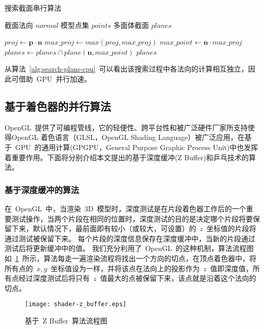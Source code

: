 \begin{algorithm}[htbp]
\small
\caption{搜索截面串行算法}
\label{alg:search-plans-cpu}
\begin{algorithmic}[1]
\REQUIRE
截面法向 $normal$
模型点集 $points$
\ENSURE
多面体截面 $planes$

        \STATE $proj \gets  \bm{p} \cdot \bm{n}$ 
        \STATE $max\_proj \gets max(proj, max\_proj)$ 
    \ENDFOR
\ENDFOR
{}
    \STATE $max\_point \gets \bm{n} \cdot max\_proj$ 
    \STATE $planes\gets planes \cap plane(\bm{n}, max\_point)$ 
\ENDFOR
\RETURN $planes$
\end{algorithmic}
\end{algorithm}

从算法~\ref{alg:search-plans-cpu}~可以看出该搜索过程中各法向的计算相互独立，因此可借助~GPU~并行加速。

\subsection{基于着色器的并行算法}
\label{subsec:determ-normals-by-shader}

OpenGL~提供了可编程管线，它的轻便性、跨平台性和被广泛硬件厂家所支持使得OpenGL
着色语言（GLSL，OpenGL Shading Language）被广泛应用，在基于~GPU~的通用计算(GPGPU，General
Purpose Graphic Process Unit)中也发挥着重要作用。下面将分别介绍本文提出的基于深度缓冲(Z Buffer)和乒乓技术的算法。

\subsubsection{基于深度缓冲的算法}
	
在~OpenGL~中，当渲染~3D~模型时，深度测试是在片段着色器工作后的一个重要测试操作，当两个片段在相同的位置时，深度测试的目的是决定哪个片段将要保留下来，默认情况下，最前面即有较小（或较大，可设置）的~$z$~坐标值的片段将通过测试被保留下来。
每个片段的深度信息保存在深度缓冲中，当新的片段通过测试后将更新缓冲中的值。
我们充分利用了~OpenGL~的这种机制，算法流程图如~\ref{fig:flowchart:zbuffer}~所示，算法每走一遍渲染流程将找出一个方向的切点，在顶点着色器中，将所有点的~$x,y$~坐标值设为一样，并将该点在法向上的投影作为~$z$~值即深度值，所有点经过深度测试后将只有~$z$~值最大的点被保留下来，该点就是沿着这个法向的切点。

\begin{figure}[htbp]
  \centering
  \texttt{[image: shader-z\_buffer.eps]}
  \caption{基于~Z Buffer~算法流程图}
  \label{fig:flowchart:zbuffer}
\end{figure}


